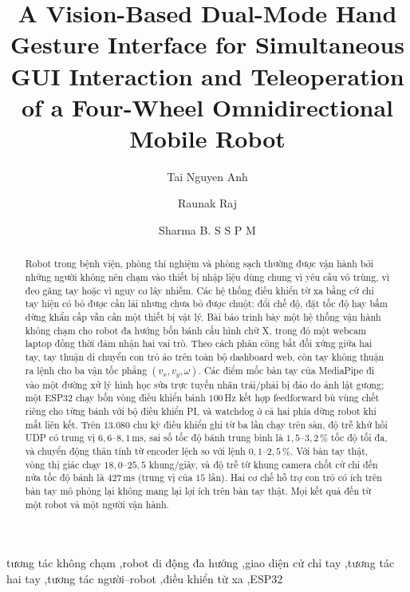 \documentclass[5p,twocolumn]{elsarticle}
\begin{document}
\begin{frontmatter}

\title{A Vision-Based Dual-Mode Hand Gesture Interface for Simultaneous GUI Interaction and Teleoperation of a Four-Wheel Omnidirectional Mobile Robot}

\author[a]{Tai Nguyen Anh}
\author[b]{Raunak Raj}
\author[c]{Sharma B. S S P M}


\begin{abstract}
Robot trong bệnh viện, phòng thí nghiệm và phòng sạch thường được vận hành bởi những người không nên chạm vào thiết bị nhập liệu dùng chung vì yêu cầu vô trùng, vì đeo găng tay hoặc vì nguy cơ lây nhiễm. Các hệ thống điều khiển từ xa bằng cử chỉ tay hiện có bỏ được cần lái nhưng chưa bỏ được chuột: đổi chế độ, đặt tốc độ hay bấm dừng khẩn cấp vẫn cần một thiết bị vật lý. Bài báo trình bày một hệ thống vận hành không chạm cho robot đa hướng bốn bánh cấu hình chữ X, trong đó một webcam laptop đồng thời đảm nhận hai vai trò. Theo cách phân công bất đối xứng giữa hai tay, tay thuận di chuyển con trỏ ảo trên toàn bộ dashboard web, còn tay không thuận ra lệnh cho ba vận tốc phẳng $(v_x, v_y, \omega)$. Các điểm mốc bàn tay của MediaPipe đi vào một đường xử lý hình học sửa trực tuyến nhãn trái/phải bị đảo do ảnh lật gương; một ESP32 chạy bốn vòng điều khiển bánh $100$\,Hz kết hợp feedforward bù vùng chết riêng cho từng bánh với bộ điều khiển PI, và watchdog ở cả hai phía dừng robot khi mất liên kết. Trên $13{.}080$ chu kỳ điều khiển ghi từ ba lần chạy trên sàn, độ trễ khứ hồi UDP có trung vị $6{,}6$--$8{,}1$\,ms, sai số tốc độ bánh trung bình là $1{,}5$--$3{,}2$\,\% tốc độ tối đa, và chuyển động thân tính từ encoder lệch so với lệnh $0{,}1$--$2{,}5$\,\%. Với bàn tay thật, vòng thị giác chạy $18{,}0$--$25{,}5$ khung/giây, và độ trễ từ khung camera chốt cử chỉ đến nửa tốc độ bánh là $427$\,ms (trung vị của $15$ lần). Hai cơ chế hỗ trợ con trỏ có ích trên bàn tay mô phỏng lại không mang lại lợi ích trên bàn tay thật. Mọi kết quả đến từ một robot và một người vận hành.
\end{abstract}

\begin{keyword}
tương tác không chạm \sep robot di động đa hướng \sep giao diện cử chỉ tay \sep tương tác hai tay \sep tương tác người--robot \sep điều khiển từ xa \sep ESP32
\end{keyword}

\end{frontmatter}
\end{document}
